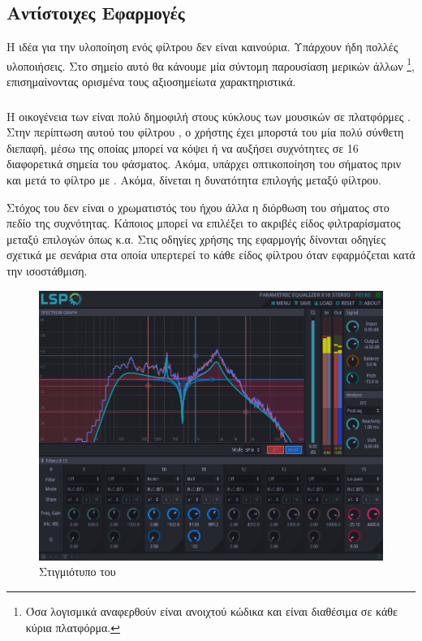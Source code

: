 \documentclass[12pt]{extarticle}
\begin{document}
\subsection{Αντίστοιχες Εφαρμογές}

Η ιδέα για την υλοποίηση ενός φίλτρου δεν είναι καινούρια. Υπάρχουν ήδη 
πολλές υλοποιήσεις. Στο σημείο αυτό θα κάνουμε μία σύντομη 
παρουσίαση μερικών άλλων  \footnote{
Όσα λογισμικά αναφερθούν είναι ανοιχτού κώδικα και είναι διαθέσιμα σε κάθε κύρια πλατφόρμα.
}, επισημαίνοντας ορισμένα τους 
αξιοσημείωτα χαρακτηριστικά.


\subsubsection{}

Η οικογένεια  των  είναι 
πολύ δημοφιλή στους κύκλους των μουσικών σε πλατφόρμες . 
Στην περίπτωση αυτού του φίλτρου \cite{LSPEQ}, ο χρήστης έχει μπορστά του μία 
πολύ σύνθετη διεπαφή, μέσω της οποίας μπορεί να κόψει ή να αυξήσει συχνότητες σε 
16 διαφορετικά σημεία του φάσματος.
Ακόμα, υπάρχει οπτικοποίηση του σήματος
πριν και μετά το φίλτρο με . Ακόμα, δίνεται 
η δυνατότητα επιλογής μεταξύ  φίλτρου.

Στόχος του  δεν είναι ο χρωματιστός του ήχου άλλα 
η διόρθωση του σήματος στο πεδίο της συχνότητας. Κάποιος μπορεί 
να επιλέξει το ακριβές είδος φιλτραρίσματος μεταξύ επιλογών 
όπως  κ.α.
Στις οδηγίες χρήσης της εφαρμογής δίνονται οδηγίες σχετικά με σενάρια στα οποία υπερτερεί το κάθε 
είδος φίλτρου όταν εφαρμόζεται κατά την ισοστάθμιση.

\begin{figure}[!htb]
    \centering
    \includegraphics[width=.8\textwidth]{./assets/lsp_eq.png}
    \caption{Στιγμιότυπο του }
    \label{fig:}
\end{figure}
\end{document}
